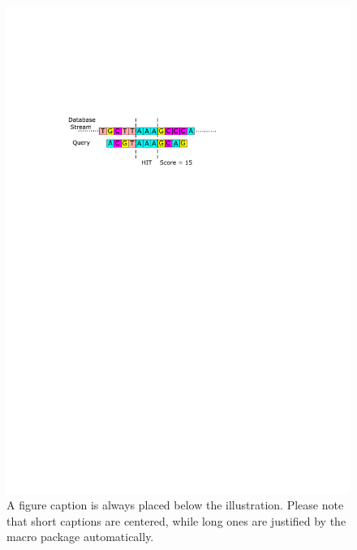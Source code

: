 \begin{figure}
\includegraphics[width=\textwidth]{Figures/Algorithm2.pdf}
\caption{A figure caption is always placed below the illustration.
Please note that short captions are centered, while long ones are
justified by the macro package automatically.} \label{fig3}
\end{figure}
